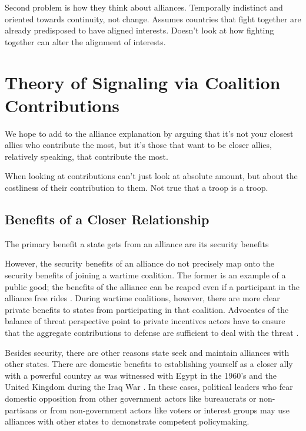 \documentclass[12pt,letterpaper]{article}
\begin{document}
	Second problem is how they think about alliances. Temporally indistinct and oriented towards continuity, not change. Assumes countries that fight together are already predisposed to have aligned interests. Doesn't look at how fighting together can alter the alignment of interests.

\section{Theory of Signaling via Coalition Contributions}
	We hope to add to the alliance explanation by arguing that it's not your closest allies who contribute the most, but it's those that want to be closer allies, relatively speaking, that contribute the most.
		
	When looking at contributions can't just look at absolute amount, but about the costliness of their contribution to them. Not true that a troop is a troop.
	
	\subsection{Benefits of a Closer Relationship}
		The primary benefit a state gets from an alliance are its security benefits 

		However, the security benefits of an alliance do not precisely map onto the security benefits of joining a wartime coalition. The former is an example of a public good; the benefits of the alliance can be reaped even if a participant in the alliance free rides \citep{olson_economictheoryalliances_1966}. During wartime coalitions, however, there are more clear private benefits to states from participating in that coalition. Advocates of the balance of threat perspective point to private incentives actors have to ensure that the aggregate contributions to defense are sufficient to deal with the threat \citep{bennett_friendsneedburden_1997a, baltrusaitis_coalitionpoliticsiraq_2010, davidson_neoclassicalrealistexplanation_2011}.
		
		Besides security, there are other reasons state seek and maintain alliances with other states. There are domestic benefits to establishing yourself as a closer ally with a powerful country as was witnessed with Egypt in the 1960's \citep{barnett_domesticsourcesalliances_1991} and the United Kingdom during the Iraq War \citep{davidson_americaallieswar_2011}. In these cases, political leaders who fear domestic opposition from other government actors like bureaucrats or non-partisans or from non-government actors like voters or interest groups may use alliances with other states to demonstrate competent policymaking.
\end{document}

